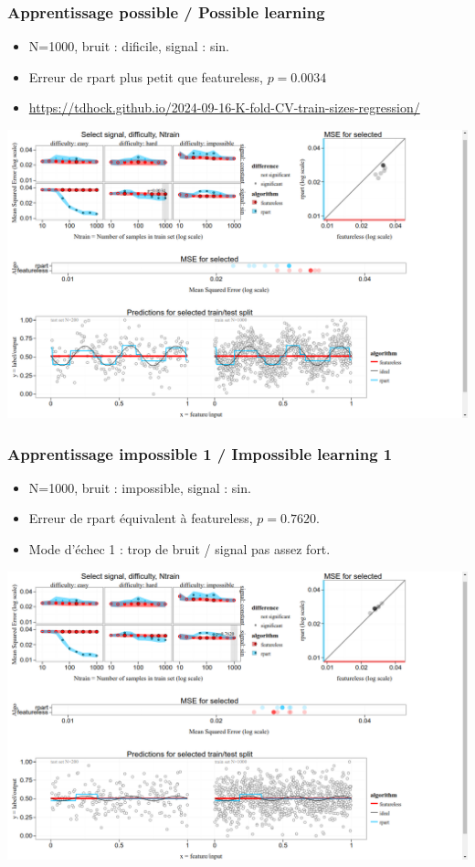 \documentclass{beamer}
\begin{document}
\begin{frame}
  \frametitle{Apprentissage possible / Possible learning}
  \begin{itemize}
  \item N=1000, bruit : dificile, signal : sin.
  \item Erreur de rpart plus petit que featureless, $p=0.0034$
  \item \tiny \url{https://tdhock.github.io/2024-09-16-K-fold-CV-train-sizes-regression/}
  \end{itemize}
  \includegraphics[width=\textwidth]{hard-1000}
\end{frame}

\begin{frame}
  \frametitle{Apprentissage impossible 1 / Impossible learning 1}
  \begin{itemize}
  \item N=1000, bruit : impossible, signal : sin.
  \item Erreur de rpart équivalent à featureless, $p=0.7620$.
  \item Mode d'échec 1 : trop de bruit / signal pas assez fort.
  \end{itemize}
  \includegraphics[width=\textwidth]{impossible-1000}
\end{frame}
\end{document}
